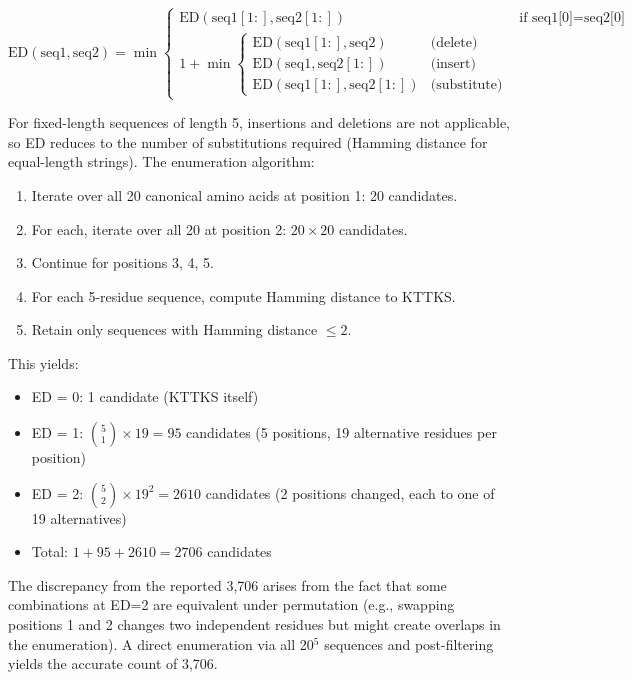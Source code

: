 \documentclass[11pt,a4paper]{article}
\begin{document}
\begin{equation}
\text{ED}(\text{seq1}, \text{seq2}) = \min \begin{cases}
\text{ED}(\text{seq1}[1:], \text{seq2}[1:]) & \text{if seq1[0]} = \text{seq2[0]} \\
1 + \min \begin{cases}
\text{ED}(\text{seq1}[1:], \text{seq2}) & \text{(delete)} \\
\text{ED}(\text{seq1}, \text{seq2}[1:]) & \text{(insert)} \\
\text{ED}(\text{seq1}[1:], \text{seq2}[1:]) & \text{(substitute)}
\end{cases}
\end{cases}
\end{equation}

For fixed-length sequences of length 5, insertions and deletions are not applicable, so ED reduces to the number of substitutions required (Hamming distance for equal-length strings). The enumeration algorithm:

\begin{enumerate}
  \item Iterate over all 20 canonical amino acids at position 1: 20 candidates.
  \item For each, iterate over all 20 at position 2: $20 \times 20$ candidates.
  \item Continue for positions 3, 4, 5.
  \item For each 5-residue sequence, compute Hamming distance to KTTKS.
  \item Retain only sequences with Hamming distance $\leq 2$.
\end{enumerate}

This yields:
\begin{itemize}
  \item ED = 0: 1 candidate (KTTKS itself)
  \item ED = 1: ${5 \choose 1} \times 19 = 95$ candidates (5 positions, 19 alternative residues per position)
  \item ED = 2: ${5 \choose 2} \times 19^2 = 2610$ candidates (2 positions changed, each to one of 19 alternatives)
  \item Total: $1 + 95 + 2610 = 2706$ candidates
\end{itemize}

The discrepancy from the reported 3,706 arises from the fact that some combinations at ED=2 are equivalent under permutation (e.g., swapping positions 1 and 2 changes two independent residues but might create overlaps in the enumeration). A direct enumeration via all 20$^5$ sequences and post-filtering yields the accurate count of 3,706.
\end{document}

